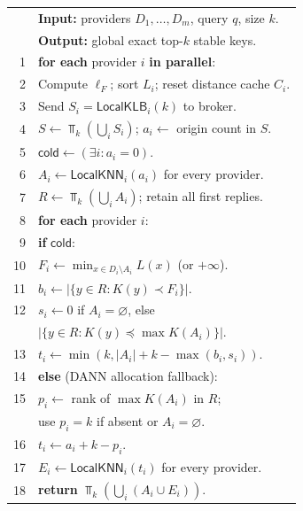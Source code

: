 \begin{algorithm}[t]
\caption{FedSeq: complete unperturbed query}
\label{alg:fedseq}
\small
\begin{tabular}{r p{}}
 & \textbf{Input:} providers $D_1,\ldots,D_m$, query $q$, size $k$.\\
 & \textbf{Output:} global exact top-$k$ stable keys.\\
1 & \textbf{for each} provider $i$ \textbf{in parallel}:\\
2 & \quad Compute $\ell_F$; sort $L_i$; reset distance cache $C_i$.\\
3 & \quad Send $S_i=\mathsf{LocalKLB}_i(k)$ to broker.\\
4 & $S\gets\Top_k(\bigcup_i S_i)$; $a_i\gets$ origin count in $S$.\\
5 & $\mathsf{cold}\gets(\exists i:a_i=0)$.\\
6 & $A_i\gets\mathsf{LocalKNN}_i(a_i)$ for every provider.\\
7 & $R\gets\Top_k(\bigcup_i A_i)$; retain all first replies.\\
8 & \textbf{for each} provider $i$:\\
9 & \quad \textbf{if} $\mathsf{cold}$:\\
10 & \qquad $F_i\gets\min_{x\in D_i\setminus A_i}L(x)$ (or $+\infty$).\\
11 & \qquad $b_i\gets|\{y\in R:K(y)\prec F_i\}|$.\\
12 & \qquad $s_i\gets0$ if $A_i=\varnothing$, else\\
 & \qquad\quad $|\{y\in R:K(y)\preceq\max K(A_i)\}|$.\\
13 & \qquad $t_i\gets\min(k,|A_i|+k-\max(b_i,s_i))$.\\
14 & \quad \textbf{else} (DANN allocation fallback):\\
15 & \qquad $p_i\gets$ rank of $\max K(A_i)$ in $R$;\\
 & \qquad\quad use $p_i=k$ if absent or $A_i=\varnothing$.\\
16 & \qquad $t_i\gets a_i+k-p_i$.\\
17 & $E_i\gets\mathsf{LocalKNN}_i(t_i)$ for every provider.\\
18 & \textbf{return} $\Top_k(\bigcup_i(A_i\cup E_i))$.\\
\end{tabular}
\end{algorithm}
